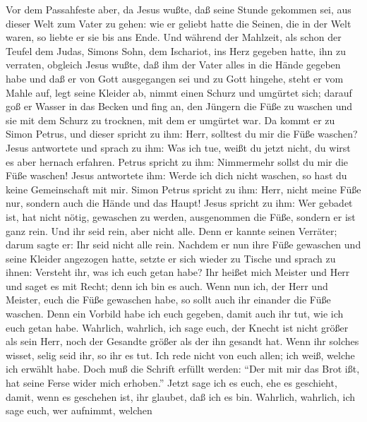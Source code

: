  Vor dem Passahfeste aber, da Jesus wußte, daß seine
Stunde gekommen sei, aus dieser Welt zum Vater zu gehen: wie er geliebt
hatte die Seinen, die in der Welt waren, so liebte er sie bis ans Ende.
 Und während der Mahlzeit, als schon der Teufel dem Judas,
Simons Sohn, dem Ischariot, ins Herz gegeben hatte, ihn zu verraten,
 obgleich Jesus wußte, daß ihm der Vater alles in die
Hände gegeben habe und daß er von Gott ausgegangen sei und zu Gott
hingehe,  steht er vom Mahle auf, legt seine Kleider ab,
nimmt einen Schurz und umgürtet sich;  darauf goß er
Wasser in das Becken und fing an, den Jüngern die Füße zu waschen und
sie mit dem Schurz zu trocknen, mit dem er umgürtet war. 
Da kommt er zu Simon Petrus, und dieser spricht zu ihm: Herr, solltest
du mir die Füße waschen?  Jesus antwortete und sprach zu
ihm: Was ich tue, weißt du jetzt nicht, du wirst es aber hernach
erfahren.  Petrus spricht zu ihm: Nimmermehr sollst du mir
die Füße waschen! Jesus antwortete ihm: Werde ich dich nicht waschen, so
hast du keine Gemeinschaft mit mir.  Simon Petrus spricht
zu ihm: Herr, nicht meine Füße nur, sondern auch die Hände und das
Haupt!  Jesus spricht zu ihm: Wer gebadet ist, hat nicht
nötig, gewaschen zu werden, ausgenommen die Füße, sondern er ist ganz
rein. Und ihr seid rein, aber nicht alle.  Denn er kannte
seinen Verräter; darum sagte er: Ihr seid nicht alle rein.
 Nachdem er nun ihre Füße gewaschen und seine Kleider
angezogen hatte, setzte er sich wieder zu Tische und sprach zu ihnen:
Versteht ihr, was ich euch getan habe?  Ihr heißet mich
Meister und Herr und saget es mit Recht; denn ich bin es auch.
 Wenn nun ich, der Herr und Meister, euch die Füße
gewaschen habe, so sollt auch ihr einander die Füße waschen.
 Denn ein Vorbild habe ich euch gegeben, damit auch ihr
tut, wie ich euch getan habe.  Wahrlich, wahrlich, ich
sage euch, der Knecht ist nicht größer als sein Herr, noch der Gesandte
größer als der ihn gesandt hat.  Wenn ihr solches wisset,
selig seid ihr, so ihr es tut.  Ich rede nicht von euch
allen; ich weiß, welche ich erwählt habe. Doch muß die Schrift erfüllt
werden: ``Der mit mir das Brot ißt, hat seine Ferse wider mich
erhoben.''  Jetzt sage ich es euch, ehe es geschieht,
damit, wenn es geschehen ist, ihr glaubet, daß ich es bin.
 Wahrlich, wahrlich, ich sage euch, wer aufnimmt, welchen
